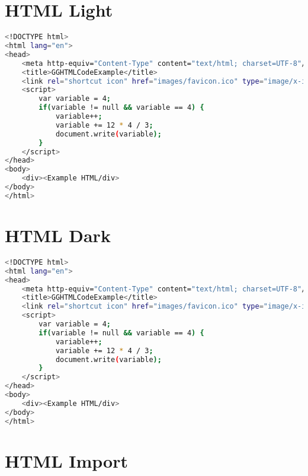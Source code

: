 \section{HTML Light}

\begin{lstlisting}[language=bash, style=customStyleHTMLLight, caption=Snippet title]
<!DOCTYPE html>
<html lang="en">
<head>
    <meta http-equiv="Content-Type" content="text/html; charset=UTF-8"/>
    <title>GGHTMLCodeExample</title>
    <link rel="shortcut icon" href="images/favicon.ico" type="image/x-icon">
    <script>
    	var variable = 4;
    	if(variable != null && variable == 4) {		
    		variable++;
    		variable += 12 * 4 / 3;
    		document.write(variable);
    	}
    </script>
</head>
<body>
    <div><Example HTML/div>
</body>
</html>
\end{lstlisting}

\section{HTML Dark}

\begin{lstlisting}[language=bash, style=customStyleHTMLDark, caption=Snippet title]
<!DOCTYPE html>
<html lang="en">
<head>
    <meta http-equiv="Content-Type" content="text/html; charset=UTF-8"/>
    <title>GGHTMLCodeExample</title>
    <link rel="shortcut icon" href="images/favicon.ico" type="image/x-icon">
    <script>
    	var variable = 4;
    	if(variable != null && variable == 4) {		
    		variable++;
    		variable += 12 * 4 / 3;
    		document.write(variable);
    	}
    </script>
</head>
<body>
    <div><Example HTML/div>
</body>
</html>
\end{lstlisting}

\section{HTML Import}